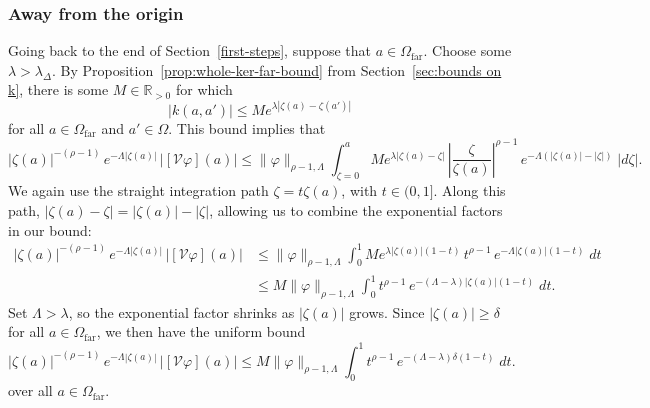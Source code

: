 \documentclass{article}
\theoremstyle{definition}
\theoremstyle{plain}
\newcommand{\R}{\mathbb{R}}
\newcommand{\volterra}{\mathcal{V}}
\newcommand{\far}{\Omega_\text{far}}
\begin{document}
\subsubsection{Away from the origin}\label{far-bound}
Going back to the end of Section~\ref{first-steps}, suppose that $a \in \far$. Choose some $\lambda > \lambda_\Delta$. By Proposition~\ref{prop:whole-ker-far-bound} from Section~\ref{sec:bounds on k}, there is some $M\in\R_{>0}$ for which
\[ |k(a, a')| \le M e^{\lambda |\zeta(a) - \zeta(a')|} \]
for all $a \in \far$ and $a' \in \Omega$. This bound implies that
\[ |\zeta(a)|^{-(\rho-1)}\,e^{-\Lambda|\zeta(a)|}\,\big|[\volterra\varphi](a)\big| \le \|\varphi\|_{\rho-1, \Lambda} \int_{\zeta = 0}^a M e^{\lambda |\zeta(a) - \zeta|}\,\left|\frac{\zeta}{\zeta(a)}\right|^{\rho-1}\,e^{-\Lambda(|\zeta(a)| - |\zeta|)}\;|d\zeta|. \]
We again use the straight integration path $\zeta = t \zeta(a)$, with $t \in (0, 1]$. Along this path, $|\zeta(a) - \zeta| = |\zeta(a)| - |\zeta|$, allowing us to combine the exponential factors in our bound:
\begin{align*}
|\zeta(a)|^{-(\rho-1)}\,e^{-\Lambda|\zeta(a)|}\,\big|[\volterra\varphi](a)\big| & \le \|\varphi\|_{\rho-1, \Lambda} \int_0^1 M e^{\lambda |\zeta(a)|(1 - t)}\,t^{\rho-1}\,e^{-\Lambda |\zeta(a)|(1 - t)}\;dt \\
& \le M \|\varphi\|_{\rho-1, \Lambda} \int_0^1 t^{\rho-1}\,e^{-(\Lambda - \lambda)|\zeta(a)|(1 - t)}\;dt.
\end{align*}
Set $\Lambda > \lambda$, so the exponential factor shrinks as $|\zeta(a)|$ grows. Since $|\zeta(a)| \ge \delta$ for all $a \in \far$, we then have the uniform bound
\[ |\zeta(a)|^{-(\rho-1)}\,e^{-\Lambda|\zeta(a)|}\,\big|[\volterra\varphi](a)\big| \le M \|\varphi\|_{\rho-1, \Lambda} \int_0^1 t^{\rho-1}\,e^{-(\Lambda - \lambda)\delta(1 - t)}\;dt. \]
over all $a \in \far$.
\end{document}
